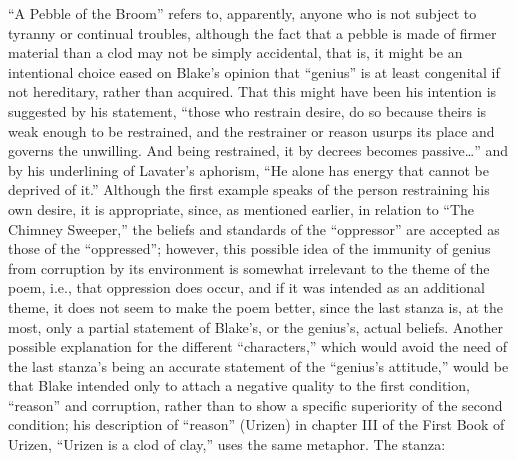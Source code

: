 
\enquote{A Pebble of the Broom} refers to, apparently, anyone who is not subject to tyranny or continual troubles,
although the fact that a pebble is made of firmer material than a clod may not be simply accidental, that is, it
might be an intentional choice eased on Blake's opinion that \enquote{genius} is at least congenital if not
hereditary, rather than acquired. That this might have been his intention is suggested by his statement, \enquote{those who
restrain desire, do so because theirs is weak enough to be restrained, and the restrainer or reason usurps
its place and governs the unwilling. And being restrained, it by decrees becomes passive\dots}\supercite{kazin:portable-blake}
and by his underlining of Lavater's aphorism, \enquote{He alone has energy that cannot be deprived of it.}\supercite{keynes:william-blake}
Although the first example speaks of the person restraining his own desire, it is appropriate, since, as mentioned earlier, in relation to \enquote{The Chimney Sweeper,}
the beliefs and standards of the \enquote{oppressor} are accepted as those of the \enquote{oppressed}; however, this possible idea of the immunity
of genius from corruption by its environment is somewhat irrelevant to the theme of the poem, i.e., that oppression does occur,
and if it was intended as an additional theme, it does not seem to make the poem better, since the last stanza
is, at the most, only a partial statement of Blake's, or the genius's, actual beliefs. Another possible explanation for the
different \enquote{characters,} which would avoid the need of the last stanza's being an accurate statement of the \enquote{genius's attitude,} would be
that Blake intended only to attach a negative quality to the first condition, \enquote{reason} and corruption, rather than to show a specific
superiority of the second condition; his description of \enquote{reason} (Urizen) in chapter III of the First Book of Urizen, \enquote{Urizen is a
clod of clay,} uses the same metaphor. The stanza:


